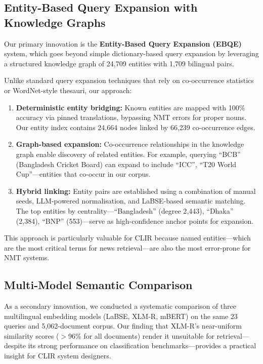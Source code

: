 \documentclass[12pt,a4paper]{article}
\begin{document}
\subsection{Entity-Based Query Expansion with Knowledge Graphs}

Our primary innovation is the \textbf{Entity-Based Query Expansion (EBQE)} system, which goes beyond simple dictionary-based query expansion by leveraging a structured knowledge graph of 24{,}709 entities with 1{,}709 bilingual pairs.

Unlike standard query expansion techniques that rely on co-occurrence statistics or WordNet-style thesauri, our approach:

\begin{enumerate}
    \item \textbf{Deterministic entity bridging:} Known entities are mapped with 100\% accuracy via pinned translations, bypassing NMT errors for proper nouns. Our entity index contains 24{,}664 nodes linked by 66{,}239 co-occurrence edges.
    \item \textbf{Graph-based expansion:} Co-occurrence relationships in the knowledge graph enable discovery of related entities. For example, querying ``BCB'' (Bangladesh Cricket Board) can expand to include ``ICC'', ``T20 World Cup''---entities that co-occur in our corpus.
    \item \textbf{Hybrid linking:} Entity pairs are established using a combination of manual seeds, LLM-powered normalisation, and LaBSE-based semantic matching. The top entities by centrality---``Bangladesh'' (degree 2{,}443), ``Dhaka'' (2{,}384), ``BNP'' (553)---serve as high-confidence anchor points for expansion.
\end{enumerate}

This approach is particularly valuable for CLIR because named entities---which are the most critical terms for news retrieval---are also the most error-prone for NMT systems.

\subsection{Multi-Model Semantic Comparison}

As a secondary innovation, we conducted a systematic comparison of three multilingual embedding models (LaBSE, XLM-R, mBERT) on the same 23 queries and 5{,}062-document corpus. Our finding that XLM-R's near-uniform similarity scores ($>$96\% for all documents) render it unsuitable for retrieval---despite its strong performance on classification benchmarks---provides a practical insight for CLIR system designers.
\end{document}
